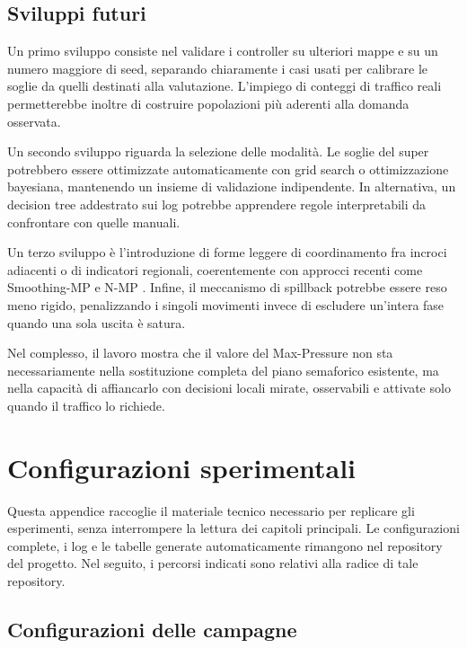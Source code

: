 \documentclass[12pt,a4paper,oneside]{report}
\numberwithin{equation}{chapter}
\begin{document}
\section{Sviluppi futuri}

Un primo sviluppo consiste nel validare i controller su ulteriori mappe e su
un numero maggiore di seed, separando chiaramente i casi usati per calibrare le
soglie da quelli destinati alla valutazione. L'impiego di conteggi di traffico
reali permetterebbe inoltre di costruire popolazioni più aderenti alla domanda
osservata.

Un secondo sviluppo riguarda la selezione delle modalità. Le soglie del super
potrebbero essere ottimizzate automaticamente con grid search o ottimizzazione
bayesiana, mantenendo un insieme di validazione indipendente. In alternativa,
un decision tree addestrato sui log potrebbe apprendere regole interpretabili
da confrontare con quelle manuali.

Un terzo sviluppo è l'introduzione di forme leggere di coordinamento fra
incroci adiacenti o di indicatori regionali, coerentemente con approcci recenti
come Smoothing-MP e N-MP \cite{xu2024smoothing,liu2024nmp}. Infine, il
meccanismo di spillback potrebbe essere reso meno rigido, penalizzando i singoli
movimenti invece di escludere un'intera fase quando una sola uscita è satura.

Nel complesso, il lavoro mostra che il valore del Max-Pressure non sta
necessariamente nella sostituzione completa del piano semaforico esistente, ma
nella capacità di affiancarlo con decisioni locali mirate, osservabili e
attivate solo quando il traffico lo richiede.

\appendix
\chapter{Configurazioni sperimentali}
\label{chap:appendici}

Questa appendice raccoglie il materiale tecnico necessario per replicare gli
esperimenti, senza interrompere la lettura dei capitoli principali. Le
configurazioni complete, i log e le tabelle generate automaticamente rimangono
nel repository del progetto. Nel seguito, i percorsi indicati sono relativi alla
radice di tale repository.

\section{Configurazioni delle campagne}
\end{document}
